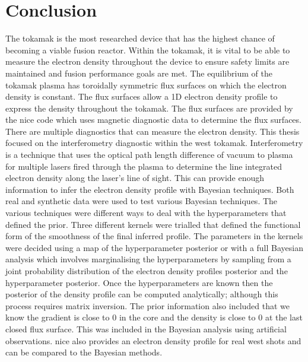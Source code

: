 \chapter{Conclusion}

The tokamak is the most researched device that has the highest chance of becoming a viable fusion reactor.  Within the tokamak, it is vital to be able to measure the electron density throughout the device to ensure safety limits are maintained and fusion performance goals are met. The equilibrium of the tokamak plasma has toroidally symmetric flux surfaces on which the electron density is constant. The flux surfaces allow a 1D electron density profile to express the density throughout the tokamak. The flux surfaces are provided by the \gls{nice} code which uses magnetic diagnostic data to determine the flux surfaces. There are multiple diagnostics that can measure the electron density. This thesis focused on the interferometry diagnostic within the \gls{west} tokamak. Interferometry is a technique that uses the optical path length difference of vacuum to plasma for multiple lasers fired through the plasma to determine the line integrated electron density along the laser's line of sight. This can provide enough information to infer the electron density profile with Bayesian techniques. Both real and synthetic data were used to test various Bayesian techniques. The various techniques were different ways to deal with the hyperparameters that defined the prior. Three different kernels were trialled that defined the functional form of the smoothness of the final inferred profile. The parameters in the kernels were decided using a \gls{map} of the hyperparameter posterior or with a full Bayesian analysis which involves marginalising the hyperparameters by sampling from a joint probability distribution of the electron density profiles posterior and the hyperparameter posterior. Once the hyperparameters are known then the posterior of the density profile can be computed analytically; although this process requires matrix inversion. The prior information also included that we know the gradient is close to 0 in the core and the density is close to 0 at the last closed flux surface. This was included in the Bayesian analysis using artificial observations. \gls{nice} also provides an electron density profile for real \gls{west} shots and can be compared to the Bayesian methods.

